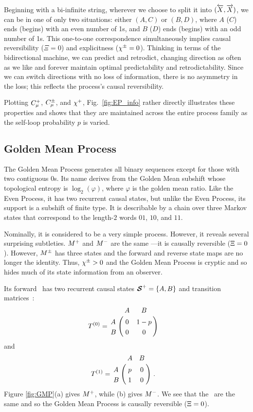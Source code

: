 Beginning with a bi-infinite string, wherever we choose to split it into
$(\smash{\overleftarrow {{X}}}, \smash{\overrightarrow{{X}}})$, we can be in one of only two situations: either
$(A,C)$ or $(B,D)$,
where $A$ ($C$) ends (begins) with an even number of 1s, and $B$ ($D$) ends
(begins) with an odd number of 1s. This one-to-one correspondence
simultaneously implies causal reversibility ($\Xi = 0$) and explicitness
($\chi^{\pm} = 0$). Thinking in terms of the bidirectional
machine, we can predict and retrodict, changing direction as often as we like 
and forever maintain optimal predictability and retrodictability. Since we can 
switch directions with no loss of information, there is no asymmetry in the
loss; this reflects the process's causal reversibility.

Plotting $C_\mu^{+}$, $C_\mu^{\pm}$, and $\chi^{+}$, Fig.~\ref{fig:EP_info} rather
directly illustrates these properties and shows that they are maintained
across the entire process family as the self-loop probability $p$ is varied.

\subsection{Golden Mean Process}

The Golden Mean Process generates all binary sequences except for those with
two contiguous $0$s. Its name derives from the Golden Mean subshift whose
topological entropy is $\log_2(\varphi)$, where $\varphi$ is the golden mean 
ratio. Like the Even Process, it has two recurrent causal states, but 
unlike the Even Process, its support is a subshift of finite type.
It is describable by a chain over three Markov states that correspond to the 
length-$2$ words $01$, $10$, and $11$. 

Nominally, it is considered to be a 
very simple process.
However, it reveals several surprising subtleties. ${M}^{+}$ and ${M}^{-}$
are the same \eM---it is causally reversible ($\Xi=0$). However, ${M}^{\pm}$ has three
states and the forward and reverse state maps are no longer the identity. Thus,
$\chi^{\pm} > 0$ and the Golden Mean Process is cryptic and so hides much of its
state information from an observer.

Its forward \eM\ has two recurrent causal states
${\boldsymbol{\mathcal{S}}}^{+} = \{ A, B \}$ and transition matrices~\cite{Crut01a}:
\begin{align*}
T^{(0)} &=
  \bordermatrix{%
      & A & B \cr
    A & 0 & 1-p \cr
    B & 0   & 0
  }
\end{align*}
and
\begin{align*}
T^{(1)} &=
  \bordermatrix{%
      & A   & B \cr
    A & p & 0 \cr
    B & 1 & 0
  } ~.
\end{align*}
Figure \ref{fig:GMP}(a) gives ${M}^{+}$, while (b) gives ${M}^{-}$. We
see that the \eMs\ are the same and so the Golden Mean Process is causally
reversible ($\Xi = 0$).

